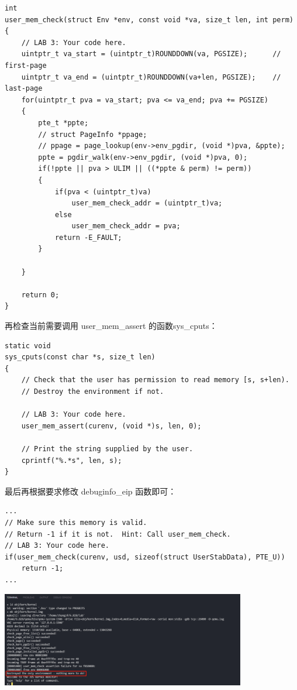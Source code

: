 \documentclass[12pt, letterpaper]{report}
\begin{document}
\newpage
\lstset{style=CStyle}
\setmainfont{Consolas}
\begin{lstlisting}
int
user_mem_check(struct Env *env, const void *va, size_t len, int perm)
{
    // LAB 3: Your code here.
    uintptr_t va_start = (uintptr_t)ROUNDDOWN(va, PGSIZE);		// first-page
    uintptr_t va_end = (uintptr_t)ROUNDDOWN(va+len, PGSIZE);	// last-page
    for(uintptr_t pva = va_start; pva <= va_end; pva += PGSIZE)
    {
        pte_t *ppte;
        // struct PageInfo *ppage;
        // ppage = page_lookup(env->env_pgdir, (void *)pva, &ppte);
        ppte = pgdir_walk(env->env_pgdir, (void *)pva, 0);
        if(!ppte || pva > ULIM || ((*ppte & perm) != perm))
        {
            if(pva < (uintptr_t)va)
                user_mem_check_addr = (uintptr_t)va;
            else
                user_mem_check_addr = pva;
            return -E_FAULT;
        }

    }

    return 0;
}    
\end{lstlisting}
\setmainfont{Times New Roman}
再检查当前需要调用 user\_mem\_assert 的函数sys\_cputs：\par 
\lstset{style=CStyle}
\setmainfont{Consolas}
\begin{lstlisting}
static void
sys_cputs(const char *s, size_t len)
{
    // Check that the user has permission to read memory [s, s+len).
    // Destroy the environment if not.

    // LAB 3: Your code here.
    user_mem_assert(curenv, (void *)s, len, 0);

    // Print the string supplied by the user.
    cprintf("%.*s", len, s);
}
\end{lstlisting}
\setmainfont{Times New Roman}
\newpage 
最后再根据要求修改 debuginfo\_eip 函数即可：\par 
\lstset{style=CStyle}
\setmainfont{Consolas}
\begin{lstlisting}
...
// Make sure this memory is valid.
// Return -1 if it is not.  Hint: Call user_mem_check.
// LAB 3: Your code here.
if(user_mem_check(curenv, usd, sizeof(struct UserStabData), PTE_U))
    return -1;
...
\end{lstlisting}
\setmainfont{Times New Roman}

\quad \par

{
\centering
\includegraphics[width=0.8\textwidth]{evilhello} \par 
}
\end{document}
